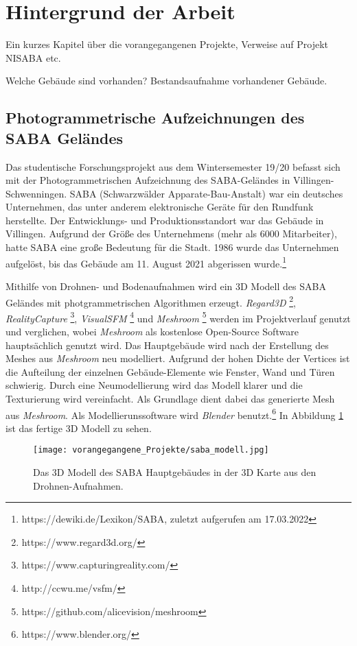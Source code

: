 \section{Hintergrund der Arbeit}
Ein kurzes Kapitel über die vorangegangenen Projekte, Verweise auf Projekt NISABA etc.

Welche Gebäude sind vorhanden? Bestandsaufnahme vorhandener Gebäude.

\subsection{Photogrammetrische Aufzeichnungen des SABA Geländes}
Das studentische Forschungsprojekt aus dem Wintersemester 19/20 \cite{reich2020} befasst sich mit  der Photogrammetrischen Aufzeichnung des SABA-Geländes in Villingen-Schwenningen. SABA (Schwarzwälder Apparate-Bau-Anstalt) war ein deutsches Unternehmen, das unter anderem elektronische Geräte für den Rundfunk herstellte. Der Entwicklungs- und Produktionsstandort war das Gebäude in Villingen. Aufgrund der Größe des Unternehmens (mehr als 6000 Mitarbeiter), hatte SABA eine große Bedeutung für die Stadt. 1986 wurde das Unternehmen aufgelöst, bis das Gebäude am 11. August 2021 abgerissen wurde.\footnote{https://dewiki.de/Lexikon/SABA, zuletzt aufgerufen am 17.03.2022} 

Mithilfe von Drohnen- und Bodenaufnahmen wird ein 3D Modell des SABA Geländes mit photgrammetrischen Algorithmen erzeugt. \textit{Regard3D} \footnote{https://www.regard3d.org/}, \textit{RealityCapture} \footnote{https://www.capturingreality.com/}, \textit{VisualSFM} \footnote{http://ccwu.me/vsfm/} und \textit{Meshroom} \footnote{https://github.com/alicevision/meshroom} werden im Projektverlauf genutzt und verglichen, wobei \textit{Meshroom} als kostenlose Open-Source Software hauptsächlich genutzt wird. Das Hauptgebäude wird nach der Erstellung des Meshes aus \textit{Meshroom} neu modelliert. Aufgrund der hohen Dichte der Vertices ist die Aufteilung der einzelnen Gebäude-Elemente wie Fenster, Wand und Türen schwierig. Durch eine Neumodellierung wird das Modell klarer und die Texturierung wird vereinfacht. Als Grundlage dient dabei das generierte Mesh aus \textit{Meshroom}. Als Modellierunssoftware wird \textit{Blender} benutzt.\footnote{https://www.blender.org/} In Abbildung \ref{fig:SABA3DModell} ist das fertige 3D Modell zu sehen.

\begin{figure}[ht]
    \centering
    \texttt{[image: vorangegangene\_Projekte/saba\_modell.jpg]}
    \caption{Das 3D Modell des SABA Hauptgebäudes in der 3D Karte aus den Drohnen-Aufnahmen.}
    \label{fig:SABA3DModell}
\end{figure}

